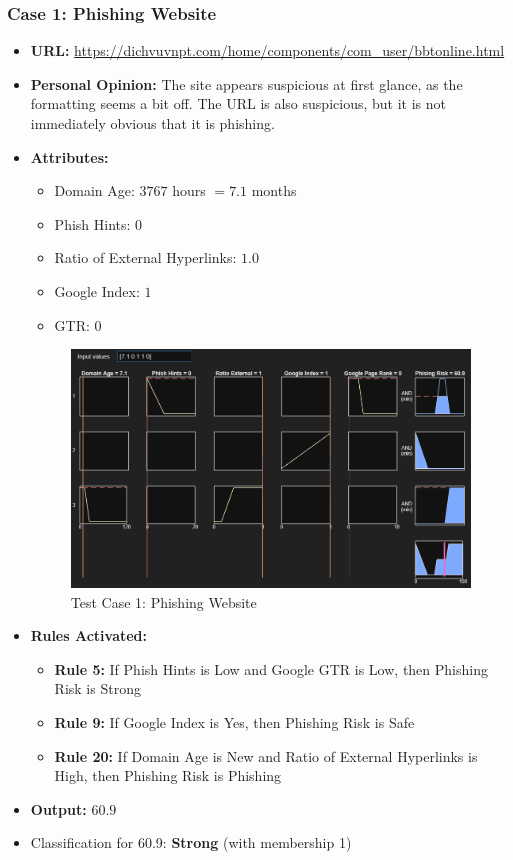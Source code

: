 \documentclass[11pt]{article}
\begin{document}
\subsubsection{Case 1: Phishing Website}

\begin{itemize}
    \item \textbf{URL:} \url{https://dichvuvnpt.com/home/components/com_user/bbtonline.html}
    \item \textbf{Personal Opinion:} The site appears suspicious at first glance, as the formatting seems a bit off. The URL is also suspicious, but it is not immediately obvious that it is phishing.
    \item \textbf{Attributes:}
    \begin{itemize}
        \item Domain Age: $3767$ hours $= 7.1$ months
        \item Phish Hints: $0$
        \item Ratio of External Hyperlinks: $1.0$
        \item Google Index: $1$
        \item GTR: $0$
    \end{itemize}
    \begin{figure}[h!]
        \centering
        \includegraphics[width=\textwidth]{test-1.png}
        \caption{Test Case 1: Phishing Website}
    \end{figure}
    \item \textbf{Rules Activated:} 
    \begin{itemize}
        \item \textbf{Rule 5:} If Phish Hints is Low and Google GTR is Low, then Phishing Risk is Strong
        \item \textbf{Rule 9:} If Google Index is Yes, then Phishing Risk is Safe
        \item \textbf{Rule 20:} If Domain Age is New and Ratio of External Hyperlinks is High, then Phishing Risk is Phishing
    \end{itemize}
    \item \textbf{Output:} $60.9$
    \item Classification for 60.9: \textbf{Strong} (with membership 1)
\end{itemize}
\end{document}
